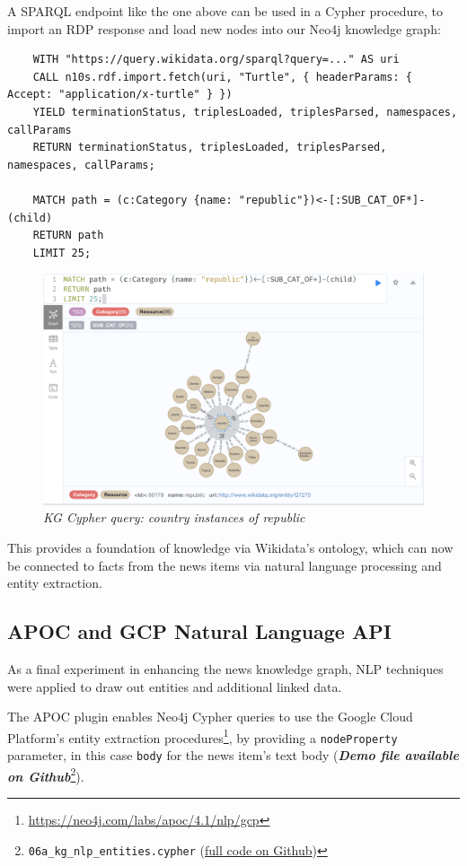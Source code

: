 \documentclass[11pt]{article}
\begin{document}
  A SPARQL endpoint like the one above can be used in a Cypher procedure, to import an RDP response and load new nodes into our Neo4j knowledge graph:
  \begin{lstlisting}
    WITH "https://query.wikidata.org/sparql?query=..." AS uri
    CALL n10s.rdf.import.fetch(uri, "Turtle", { headerParams: { Accept: "application/x-turtle" } })
    YIELD terminationStatus, triplesLoaded, triplesParsed, namespaces, callParams
    RETURN terminationStatus, triplesLoaded, triplesParsed, namespaces, callParams;

    MATCH path = (c:Category {name: "republic"})<-[:SUB_CAT_OF*]-(child)
    RETURN path
    LIMIT 25;
  \end{lstlisting}

  \begin{figure}
    \centerline{\includegraphics[scale=0.5]{category-republic.png}}
    \caption{\textit{KG Cypher query: country instances of republic}}
  \end{figure}

  This provides a foundation of knowledge via Wikidata's ontology, which can now be connected to facts from the news items via natural language processing and entity extraction.

  \subsection{APOC and GCP Natural Language API}
  As a final experiment in enhancing the news knowledge graph, NLP techniques were applied to draw out entities and additional linked data.

  The APOC plugin enables Neo4j Cypher queries to use the Google Cloud Platform's entity extraction procedures\footnote{\url{https://neo4j.com/labs/apoc/4.1/nlp/gcp}}, by providing a \lstinline{nodeProperty} parameter, in this case \lstinline{body} for the news item's text body (\textit{\textbf{Demo file available on Github}}\footnote{\lstinline{06a_kg_nlp_entities.cypher} (\href{https://github.com/Birkbeck/msc-data-science-project-2020_21---files-heychrisek/}{full code on Github})}).
\end{document}
